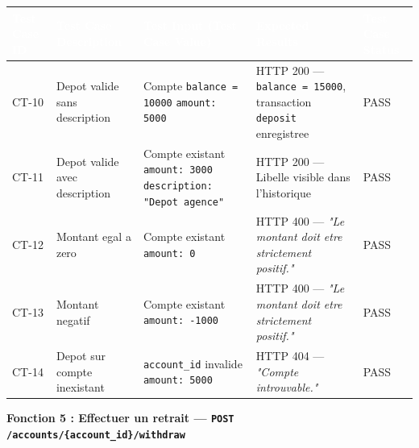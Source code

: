 \documentclass[12pt,a4paper]{article}
\begin{document}
\begin{longtable}{|L{1.6cm}|L{3.8cm}|L{5.2cm}|L{4.2cm}|L{1.8cm}|}
\hline
{}
\textbf{\textcolor{white}{Test Case ID}} & \textbf{\textcolor{white}{Test Case Description}} & \textbf{\textcolor{white}{Test Input (Test Case Value)}} & \textbf{\textcolor{white}{Expected Results}} & \textbf{\textcolor{white}{Test Case Status}} \\
\hline
CT-10 & Depot valide sans description & Compte \texttt{balance = 10000} \newline \texttt{amount: 5000} & HTTP 200 --- \texttt{balance = 15000}, transaction \texttt{deposit} enregistree & PASS \\
\hline
{}
CT-11 & Depot valide avec description & Compte existant \newline \texttt{amount: 3000} \newline \texttt{description: "Depot agence"} & HTTP 200 --- Libelle visible dans l'historique & PASS \\
\hline
CT-12 & Montant egal a zero & Compte existant \newline \texttt{amount: 0} & HTTP 400 --- \textit{"Le montant doit etre strictement positif."} & PASS \\
\hline
{}
CT-13 & Montant negatif & Compte existant \newline \texttt{amount: -1000} & HTTP 400 --- \textit{"Le montant doit etre strictement positif."} & PASS \\
\hline
CT-14 & Depot sur compte inexistant & \texttt{account\_id} invalide \newline \texttt{amount: 5000} & HTTP 404 --- \textit{"Compte introuvable."} & PASS \\
\hline
\end{longtable}

\vspace{0.2cm}
{\bfseries\textcolor{danger}{Fonction 5 : Effectuer un retrait --- \texttt{POST /accounts/\{account\_id\}/withdraw}}}
\vspace{0.1cm}
\end{document}
